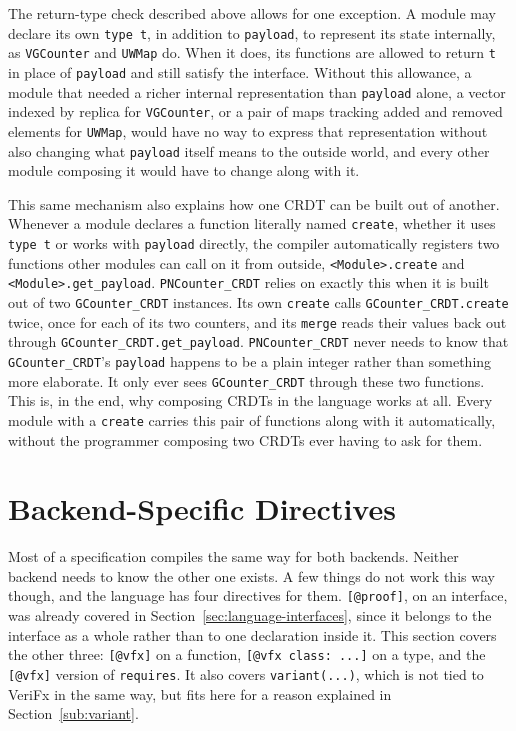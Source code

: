 The return-type check described above allows for one exception. A module may declare its own \texttt{type t}, in addition
to \texttt{payload}, to represent its state internally, as \texttt{VGCounter} and \texttt{UWMap} do. When it does, its
functions are allowed to return \texttt{t} in place of \texttt{payload} and still satisfy the interface. Without this
allowance, a module that needed a richer internal representation than \texttt{payload} alone, a vector indexed by replica
for \texttt{VGCounter}, or a pair of maps tracking added and removed elements for \texttt{UWMap}, would have no way to
express that representation without also changing what \texttt{payload} itself means to the outside world, and every other
module composing it would have to change along with it.

This same mechanism also explains how one CRDT can be built out of another. Whenever a module declares a function
literally named \texttt{create}, whether it uses \texttt{type t} or works with \texttt{payload} directly, the compiler
automatically registers two functions other modules can call on it from outside, \texttt{<Module>.create} and
\texttt{<Module>.get\_payload}. \texttt{PNCounter\_CRDT} relies on exactly this when it is built out of two
\texttt{GCounter\_CRDT} instances. Its own \texttt{create} calls \texttt{GCounter\_CRDT.create} twice, once for each of
its two counters, and its \texttt{merge} reads their values back out through \texttt{GCounter\_CRDT.get\_payload}.
\texttt{PNCounter\_CRDT} never needs to know that \texttt{GCounter\_CRDT}'s \texttt{payload} happens to be a plain integer
rather than something more elaborate. It only ever sees \texttt{GCounter\_CRDT} through these two functions. This is, in
the end, why composing CRDTs in the language works at all. Every module with a \texttt{create} carries this pair of
functions along with it automatically, without the programmer composing two CRDTs ever having to ask for them.

\section{Backend-Specific Directives}
\label{sec:language-directives}

Most of a specification compiles the same way for both backends. Neither backend needs to know the other one exists. A few
things do not work this way though, and the language has four directives for them. \texttt{[@proof]}, on an interface,
was already covered in Section~\ref{sec:language-interfaces}, since it belongs to the interface as a whole rather than to one declaration inside it.
This section covers the other three: \texttt{[@vfx]} on a function, \texttt{[@vfx class: ...]} on a type, and the
\texttt{[@vfx]} version of \texttt{requires}. It also covers \texttt{variant(...)}, which is not tied to VeriFx in the
same way, but fits here for a reason explained in Section~\ref{sub:variant}.

